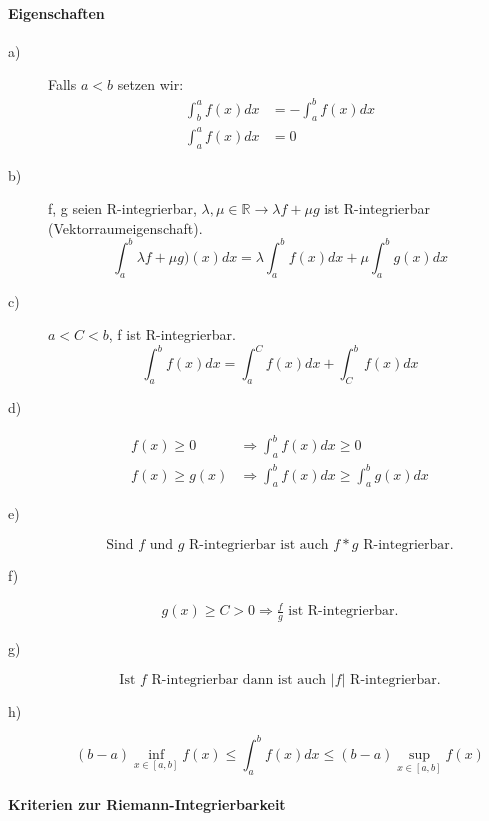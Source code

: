 \documentclass[12pt,a4paper]{article}%
\numberwithin{equation}{section}
\newcommand{\R}{\mathbb{R}} %
\newcommand{\subsubsubsection}{\paragraph}
\numberwithin{equation}{subsection}
\begin{document}
\subsubsubsection{Eigenschaften}
\begin{description}
\item[a)]
Falls $a<b$ setzen wir:
\begin{align}
\int_b^a f(x) dx &= -\int_a^bf(x)dx \nonumber \\
\int_a^a f(x) dx &= 0
\end{align}
\item[b)]
f, g seien R-integrierbar, $\lambda , \mu \in \R \rightarrow \lambda f + \mu g$ ist R-integrierbar (Vektorraumeigenschaft).
\begin{equation}
\int_a^b \lambda f + \mu g)(x)dx = \lambda \int_a^b f(x) dx + \mu \int_a^b g(x) dx
\end{equation}
\item[c)]
$a<C<b$, f ist R-integrierbar.
\begin{equation}
\int_a^b f(x) dx = \int_a^C f(x) dx + \int_C^b f(x) dx
\end{equation}
\item[d)]
\begin{align}
f(x) \ge 0 &\Rightarrow \int_a^b f(x) dx \ge 0 \nonumber \\
f(x) \ge g(x) &\Rightarrow \int_a^b f(x) dx \ge \int_a^b g(x)dx
\end{align}
\item[e)]
\begin{equation}
\text{Sind $f$ und $g$ R-integrierbar ist auch $f*g$ R-integrierbar.}
\end{equation}
\item[f)]
\begin{align}
g(x) \ge C > 0 \Rightarrow \frac{f}{g} \text{ ist R-integrierbar.}
\end{align}
\item[g)]
\begin{equation}
\text{Ist $f$ R-integrierbar dann ist auch } |f| \text{ R-integrierbar.}
\end{equation} 
\item[h)]
\begin{equation}
(b-a) \inf_{x\in[a,b]}{f(x)} \le \int_a^b f(x) dx \le (b-a) \sup_{x\in [a,b]}{f(x)}
\end{equation}
\end{description}

\subsubsubsection{Kriterien zur Riemann-Integrierbarkeit}
\end{document}
